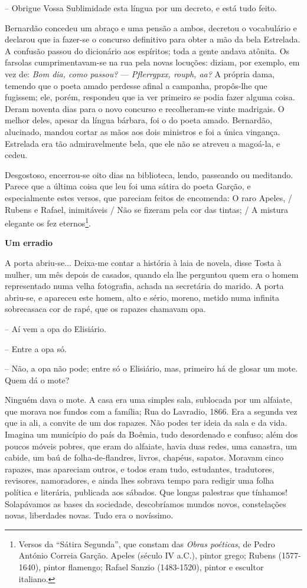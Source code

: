 -- Obrigue Vossa Sublimidade esta língua por um decreto, e está tudo
feito.

Bernardão concedeu um abraço e uma pensão a ambos, decretou o
vocabulário e declarou que ia fazer-se o concurso definitivo para obter
a mão da bela Estrelada. A confusão passou do dicionário aos espíritos;
toda a gente andava atônita. Os farsolas cumprimentavam-se na rua pela
novas locuções: diziam, por exemplo, em vez de: \emph{Bom dia, como
passou?} --- \emph{Pflerrgpxx, rouph, aa?} A própria dama, temendo que o
poeta amado perdesse afinal a campanha, propôs-lhe que fugissem; ele,
porém, respondeu que ia ver primeiro se podia fazer alguma coisa. Deram
noventa dias para o novo concurso e recolheram-se vinte madrigais. O
melhor deles, apesar da língua bárbara, foi o do poeta amado. Bernardão,
alucinado, mandou cortar as mãos aos dois ministros e foi a única
vingança. Estrelada era tão admiravelmente bela, que ele não se atreveu
a magoá-la, e cedeu.

Desgostoso, encerrou-se oito dias na biblioteca, lendo, passeando ou
meditando. Parece que a última coisa que leu foi uma sátira do poeta
Garção, e especialmente estes versos, que pareciam feitos de encomenda:
O raro Apeles, / Rubens e Rafael, inimitáveis / Não se fizeram pela cor
das tintas; / A mistura elegante os fez eternos\footnote{Versos da
  ``Sátira Segunda'', que constam das \emph{Obras poéticas}, de Pedro
  António Correia Garção. Apeles (século IV a.C.), pintor grego; Rubens
  (1577-1640), pintor flamengo; Rafael Sanzio (1483-1520), pintor e
  escultor italiano.}.

\textbf{Um erradio}

A porta abriu-se... Deixa-me contar a história à laia de novela, disse
Tosta à mulher, um mês depois de casados, quando ela lhe perguntou quem
era o homem representado numa velha fotografia, achada na secretária do
marido. A porta abriu-se, e apareceu este homem, alto e sério, moreno,
metido numa infinita sobrecasaca cor de rapé, que os rapazes chamavam
opa.

-- Aí vem a opa do Elisiário.

-- Entre a opa só.

-- Não, a opa não pode; entre só o Elisiário, mas, primeiro há de glosar
um mote. Quem dá o mote?

Ninguém dava o mote. A casa era uma simples sala, sublocada por um
alfaiate, que morava nos fundos com a família; Rua do Lavradio, 1866.
Era a segunda vez que ia ali, a convite de um dos rapazes. Não podes ter
ideia da sala e da vida. Imagina um município do país da Boêmia, tudo
desordenado e confuso; além dos poucos móveis pobres, que eram do
alfaiate, havia duas redes, uma canastra, um cabide, um baú de
folha-de-flandres, livros, chapéus, sapatos. Moravam cinco rapazes, mas
apareciam outros, e todos eram tudo, estudantes, tradutores, revisores,
namoradores, e ainda lhes sobrava tempo para redigir uma folha política
e literária, publicada aos sábados. Que longas palestras que tínhamos!
Solapávamos as bases da sociedade, descobríamos mundos novos,
constelações novas, liberdades novas. Tudo era o novíssimo.

